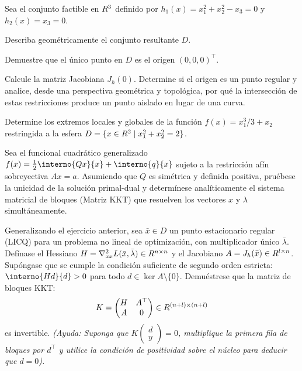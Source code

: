 \begin{exercise}\label{v1:ejer:2.8}
 Sea el conjunto factible en $R^3$ definido por $h_1(x) = x_1^2 + x_2^2 - x_3 = 0$ y $h_2(x) = x_3 = 0$.
 \begin{enuthm}
 \item Describa geométricamente el conjunto resultante $D$.
 \item Demuestre que el único punto en $D$ es el origen $(0,0,0)^\top$.
 \item Calcule la matriz Jacobiana $J_h(0)$. Determine si el origen es un punto regular y analice, desde una perspectiva geométrica y topológica, por qué la intersección de estas restricciones produce un punto aislado en lugar de una curva.
 \end{enuthm}
\end{exercise}


\begin{exercise}\label{v1:ejer:2.9}
	Determine los extremos locales y globales de la función $f(x) = x_1^3 / 3 + x_2$ restringida a la esfera $D = \{ x \in R^2 \mid x_1^2 + x_2^2 = 2 \}$.
\end{exercise}

\begin{exercise}\label{v1:ejer:2.10}
	Sea el funcional cuadrático generalizado $f(x) = \frac{1}{2}\interno{Qx}{x} + \interno{q}{x}$ sujeto a la restricción afín sobreyectiva $Ax = a$. Asumiendo que $Q$ es simétrica y definida positiva, pruébese la unicidad de la solución primal-dual y determínese analíticamente el sistema matricial de bloques (Matriz KKT) que resuelven los vectores $x$ y $\lambda$ simultáneamente.
\end{exercise}

\begin{exercise}\label{v1:ejer:2.11}
 Generalizando el ejercicio anterior, sea $\bar{x} \in D$ un punto estacionario regular (LICQ) para un problema no lineal de optimización, con multiplicador único $\bar{\lambda}$. Defínase el Hessiano $H = \nabla_{xx}^2 L(\bar{x}, \bar{\lambda}) \in R^{n \times n}$ y el Jacobiano $A = J_h(\bar{x}) \in R^{l \times n}$. Supóngase que se cumple la condición suficiente de segundo orden estricta: $\interno{Hd}{d} > 0$ para todo $d \in \ker A \setminus \{0\}$. Demuéstrese que la matriz de bloques KKT:
 \[
 K = \begin{pmatrix} H & A^\top \\ A & 0 \end{pmatrix} \in R^{(n+l) \times (n+l)}
 \]
 es invertible. \textit{(Ayuda: Suponga que $K \begin{pmatrix} d \\ y \end{pmatrix} = 0$, multiplique la primera fila de bloques por $d^\top$ y utilice la condición de positividad sobre el núcleo para deducir que $d=0$).}
\end{exercise}

